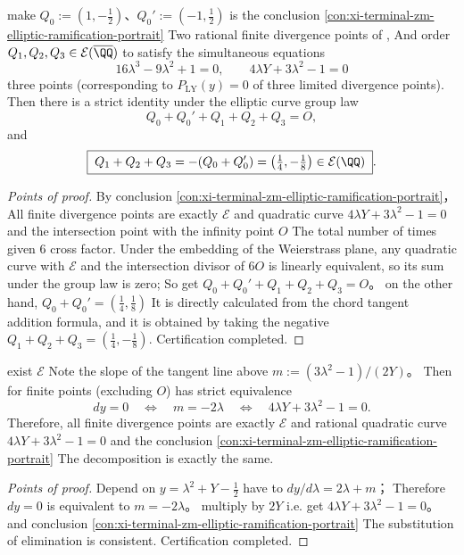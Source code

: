\begin{conclusion}\label{con:xi-terminal-zm-branchpoint-group-trace}
make \(Q_0:=(1,-\tfrac12)\)、\(Q_0':=(-1,\tfrac12)\) is the conclusion \ref{con:xi-terminal-zm-elliptic-ramification-portrait} Two rational finite divergence points of ,
And order \(Q_1,Q_2,Q_3\in\mathcal{E}(\overline{\QQ})\) to satisfy the simultaneous equations
\[
16\lambda^{3}-9\lambda^{2}+1=0,\qquad 4\lambda Y+3\lambda^{2}-1=0
\]
three points (corresponding to \(P_{\mathrm{LY}}(y)=0\) of three limited divergence points).
Then there is a strict identity under the elliptic curve group law
\[
Q_0+Q_0'+Q_1+Q_2+Q_3=O,
\]
and
\[
\boxed{\;
Q_1+Q_2+Q_3
=-(Q_0+Q_0')
=\bigl(\tfrac14,-\tfrac18\bigr)\in\mathcal{E}(\QQ)\; }.
\]
\end{conclusion}
\begin{proof}[Points of proof]
By conclusion \ref{con:xi-terminal-zm-elliptic-ramification-portrait}，
All finite divergence points are exactly \(\mathcal{E}\) and quadratic curve \(4\lambda Y+3\lambda^{2}-1=0\) and the intersection point with the infinity point \(O\) The total number of times given \(6\) cross factor.
Under the embedding of the Weierstrass plane, any quadratic curve with \(\mathcal{E}\) and the intersection divisor of \(6O\) is linearly equivalent, so its sum under the group law is zero;
So get \(Q_0+Q_0'+Q_1+Q_2+Q_3=O\)。
on the other hand,
\(
Q_0+Q_0'=(\tfrac14,\tfrac18)
\)
It is directly calculated from the chord tangent addition formula, and it is obtained by taking the negative \(Q_1+Q_2+Q_3=(\tfrac14,-\tfrac18)\). Certification completed.
\end{proof}

\begin{conclusion}[Tangential slope lock at finite bifurcation point:\(dy=0\) is equivalent to \(m=-2\lambda\)]\label{con:xi-terminal-zm-branch-slope-lock}
exist \(\mathcal{E}\) Note the slope of the tangent line above
\(
m:=(3\lambda^{2}-1)/(2Y)
\)。
Then for finite points (excluding \(O\)) has strict equivalence
\[
dy=0\quad\Longleftrightarrow\quad m=-2\lambda\quad\Longleftrightarrow\quad 4\lambda Y+3\lambda^{2}-1=0.
\]
Therefore, all finite divergence points are exactly \(\mathcal{E}\) and rational quadratic curve \(4\lambda Y+3\lambda^{2}-1=0\) and the conclusion \ref{con:xi-terminal-zm-elliptic-ramification-portrait} The decomposition is exactly the same.
\end{conclusion}
\begin{proof}[Points of proof]
Depend on \(y=\lambda^{2}+Y-\tfrac12\) have to
\(
dy/d\lambda=2\lambda+m
\)；
Therefore \(dy=0\) is equivalent to \(m=-2\lambda\)。
multiply by \(2Y\) i.e. get \(4\lambda Y+3\lambda^{2}-1=0\)。
and conclusion \ref{con:xi-terminal-zm-elliptic-ramification-portrait} The substitution of elimination is consistent. Certification completed.
\end{proof}




